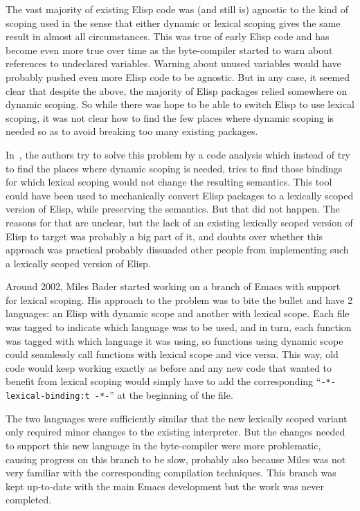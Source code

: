 \documentclass[format=acmsmall, review=false, screen=true]{acmart}
\newcommand \Elisp {Elisp}
\begin{document}
The vast majority of existing \Elisp{} code was (and still is) agnostic to
the kind of scoping used in the sense that either dynamic or lexical scoping
gives the same result in almost all circumstances.  This was true of early
\Elisp{} code and has become even more true over time as the byte-compiler
started to warn about references to undeclared variables.  Warning about
unused variables would have probably pushed even more \Elisp{} code to be
agnostic.  But in any case, it seemed clear that despite the above, the
majority of Elisp packages relied somewhere on dynamic scoping.  So while
there was hope to be able to switch \Elisp{} to use lexical scoping, it was
not clear how to find the few places where dynamic scoping is needed so as
to avoid breaking too many existing packages.

In~\cite{Neubauer01}, the authors try to solve this problem by a code
analysis which instead of try to find the places where dynamic scoping is
needed, tries to find those bindings for which lexical scoping would not
change the resulting semantics.  This tool could have been used to
mechanically convert \Elisp{} packages to a lexically scoped version of
\Elisp{}, while preserving the semantics.  But that did not happen.
The reasons for that are unclear, but the lack of an existing lexically
scoped version of \Elisp{} to target was probably a big part of it, and
doubts over whether this approach was practical probably dissuaded other
people from implementing such a lexically scoped version of \Elisp{}.

Around 2002, Miles Bader started working on a branch of Emacs with support
for lexical scoping.  His approach to the problem was to bite the bullet and
have 2 languages: an \Elisp{} with dynamic scope and another with lexical
scope.  Each file was tagged to indicate which language was to be used, and
in turn, each function was tagged with which language it was using, so
functions using dynamic scope could seamlessly call functions with lexical
scope and vice versa.  This way, old code would keep working exactly as
before and any new code that wanted to benefit from lexical scoping would
simply have to add the corresponding ``\texttt{-*- lexical-binding:t -*-}''
at the beginning of the file.

The two languages were sufficiently similar that the new lexically scoped
variant only required minor changes to the existing interpreter.  But the
changes needed to support this new language in the byte-compiler were more
problematic, causing progress on this branch to be slow, probably also
because Miles was not very familiar with the corresponding
compilation techniques.  This branch was kept up-to-date with the main Emacs
development but the work was never completed.
\end{document}
